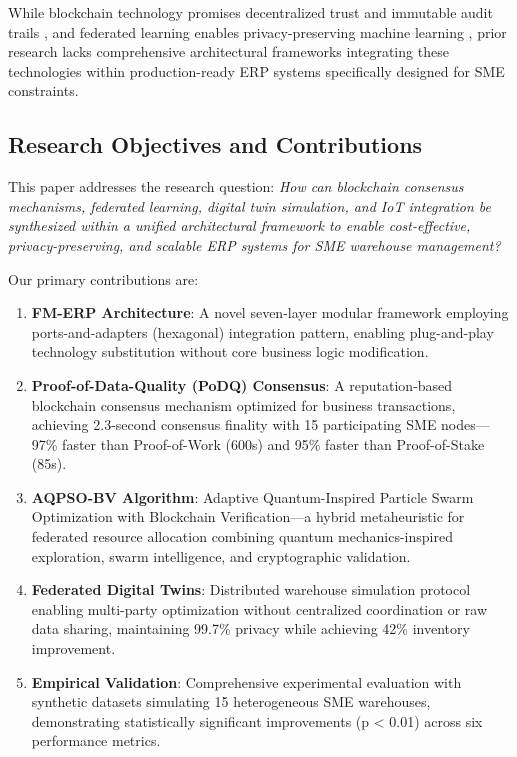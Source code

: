 \documentclass[times,10pt,twocolumn]{jucs2e}
\begin{document}
While blockchain technology promises decentralized trust and immutable audit trails \cite{Nakamoto2008,Wood2014}, and federated learning enables privacy-preserving machine learning \cite{McMahan2017,Kairouz2021}, prior research lacks comprehensive architectural frameworks integrating these technologies within production-ready ERP systems specifically designed for SME constraints.

\subsection{Research Objectives and Contributions}

This paper addresses the research question: \textit{How can blockchain consensus mechanisms, federated learning, digital twin simulation, and IoT integration be synthesized within a unified architectural framework to enable cost-effective, privacy-preserving, and scalable ERP systems for SME warehouse management?}

Our primary contributions are:

\begin{enumerate}
\item \textbf{FM-ERP Architecture}: A novel seven-layer modular framework employing ports-and-adapters (hexagonal) integration pattern, enabling plug-and-play technology substitution without core business logic modification.

\item \textbf{Proof-of-Data-Quality (PoDQ) Consensus}: A reputation-based blockchain consensus mechanism optimized for business transactions, achieving 2.3-second consensus finality with 15 participating SME nodes---97\% faster than Proof-of-Work (600s) and 95\% faster than Proof-of-Stake (85s).

\item \textbf{AQPSO-BV Algorithm}: Adaptive Quantum-Inspired Particle Swarm Optimization with Blockchain Verification---a hybrid metaheuristic for federated resource allocation combining quantum mechanics-inspired exploration, swarm intelligence, and cryptographic validation.

\item \textbf{Federated Digital Twins}: Distributed warehouse simulation protocol enabling multi-party optimization without centralized coordination or raw data sharing, maintaining 99.7\% privacy while achieving 42\% inventory improvement.

\item \textbf{Empirical Validation}: Comprehensive experimental evaluation with synthetic datasets simulating 15 heterogeneous SME warehouses, demonstrating statistically significant improvements (p < 0.01) across six performance metrics.
\end{enumerate}
\end{document}
